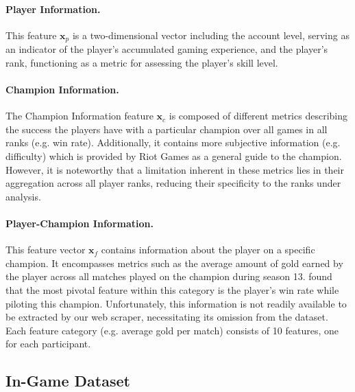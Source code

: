 \documentclass[12pt, a4paper, headinclude, twoside, plainheadsepline, open=right, numbers=noenddot, hidelinks, toc=listof, toc=bibliography]{scrreprt}
\begin{document}
\paragraph{Player Information.}
This feature $\mathbf{x}_p$ is a two-dimensional vector including the account level, serving as an indicator of the player's accumulated gaming experience, and the player's rank, functioning as a metric for assessing the player's skill level.

\paragraph{Champion Information.}
The Champion Information feature $\mathbf{x}_c$ is composed of different metrics describing the success the players have with a particular champion over all games in all ranks (e.g. win rate).
Additionally, it contains more subjective information (e.g. difficulty) which is provided by Riot Games as a general guide to the champion.
However, it is noteworthy that a limitation inherent in these metrics lies in their aggregation across all player ranks, reducing their specificity to the ranks under analysis.

\paragraph{Player-Champion Information.}
This feature vector $\mathbf{x}_f$ contains information about the player on a specific champion.
It encompasses metrics such as the average amount of gold earned by the player across all matches played on the champion during season 13. 
 \cite{costaFeatureAnalysisLeague2021} found that  the most pivotal feature within this category is the player's win rate while piloting this champion.
Unfortunately, this information is not readily available to be extracted by our web scraper,  necessitating its omission from the dataset.
Each feature category (e.g.  average gold per match) consists of 10 features, one for each participant.

\subsection{In-Game Dataset}
\label{ssec:in_game_data}
\end{document}
